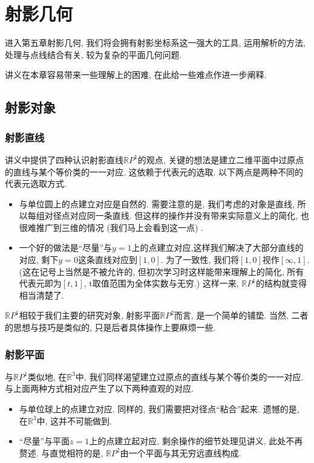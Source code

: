 \documentclass[./main.tex]{subfiles}
\begin{document}
\chapter{射影几何}
进入第五章射影几何, 我们将会拥有射影坐标系这一强大的工具, 运用解析的方法, 处理与点线结合有关, 较为复杂的平面几何问题. 

讲义在本章容易带来一些理解上的困难, 在此给一些难点作进一步阐释. 
\section{射影对象}
\subsection{射影直线}
    讲义中提供了四种认识射影直线$\mathbb{R}P ^{1}$的观点, 关键的想法是建立二维平面中过原点的直线与某个等价类的一一对应. 这依赖于代表元的选取. 以下两点是两种不同的代表元选取方式.
    \begin{itemize}
        \item 与单位圆上的点建立对应是自然的. 需要注意的是, 我们考虑的对象是直线, 所以每组对径点对应同一条直线. 但这样的操作并没有带来实际意义上的简化, 也很难推广到三维的情况 (我们马上会看到这一点) .
        \item 一个好的做法是``尽量''与$y=1$上的点建立对应,这样我们解决了大部分直线的对应, 剩下$y=0$这条直线对应到$\left[1,0\right]$. 为了一致性, 我们将$\left[1,0\right] $视作$\left[\infty,1 \right]$.  (这在记号上当然是不被允许的, 但初次学习时这样能带来理解上的简化, 所有代表元即为$\left[t,1\right] $, t取值范围为全体实数与无穷.) 这样一来, $\mathbb{R}P ^{1}$的结构就变得相当清楚了.
    \end{itemize}
$\mathbb{R}P ^{1}$相较于我们主要的研究对象, 射影平面$\mathbb{R}P ^{2}$而言, 是一个简单的铺垫. 当然, 二者的思想与技巧是类似的, 只是后者具体操作上要麻烦一些. 
\subsection{射影平面}
与$\mathbb{R}P ^{1}$类似地, 在$\mathbb{R}^{3}$中, 我们同样渴望建立过原点的直线与某个等价类的一一对应. 与上面两种方式相对应产生了以下两种直观的对应. 
\begin{itemize}
    \item 与单位球上的点建立对应. 同样的, 我们需要把对径点``粘合''起来. 遗憾的是, 在$\mathbb{R} ^{3}$中, 这并不可能做到.
    \item ``尽量''与平面$z=1$上的点建立起对应, 剩余操作的细节处理见讲义, 此处不再赘述. 与直觉相符的是, $\mathbb{R} P^{2}$由一个平面与其无穷远直线构成. 
\end{itemize}
\end{document}
